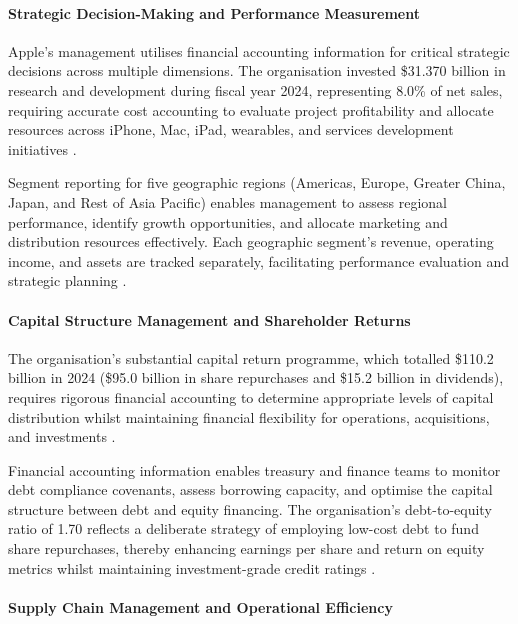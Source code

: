 \documentclass[12pt,a4paper]{article}
\begin{document}
\paragraph{Strategic Decision-Making and Performance Measurement}

Apple's management utilises financial accounting information for critical strategic decisions across multiple dimensions. The organisation invested \$31.370 billion in research and development during fiscal year 2024, representing 8.0\% of net sales, requiring accurate cost accounting to evaluate project profitability and allocate resources across iPhone, Mac, iPad, wearables, and services development initiatives \citep{apple202410k}.

Segment reporting for five geographic regions (Americas, Europe, Greater China, Japan, and Rest of Asia Pacific) enables management to assess regional performance, identify growth opportunities, and allocate marketing and distribution resources effectively. Each geographic segment's revenue, operating income, and assets are tracked separately, facilitating performance evaluation and strategic planning \citep{apple202410k}.

\paragraph{Capital Structure Management and Shareholder Returns}

The organisation's substantial capital return programme, which totalled \$110.2 billion in 2024 (\$95.0 billion in share repurchases and \$15.2 billion in dividends), requires rigorous financial accounting to determine appropriate levels of capital distribution whilst maintaining financial flexibility for operations, acquisitions, and investments \citep{apple202410k}.

Financial accounting information enables treasury and finance teams to monitor debt compliance covenants, assess borrowing capacity, and optimise the capital structure between debt and equity financing. The organisation's debt-to-equity ratio of 1.70 reflects a deliberate strategy of employing low-cost debt to fund share repurchases, thereby enhancing earnings per share and return on equity metrics whilst maintaining investment-grade credit ratings \citep{apple202410k}.

\paragraph{Supply Chain Management and Operational Efficiency}
\end{document}
